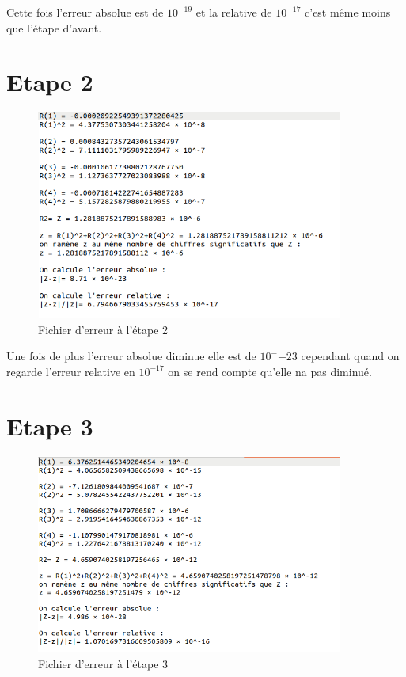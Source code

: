 \documentclass[12,french]{report}
\begin{document}
Cette fois l'erreur absolue est de $10^{-19}$ et la relative de $10^{-17}$ c'est même moins que l'étape d'avant.

\section{Etape 2}

\begin{figure}[H]
	\center
	\includegraphics[width=0.9\textwidth]{./Images/r_2_err}
	\caption{Fichier d'erreur à l'étape 2}
\end{figure}

Une fois de plus l'erreur absolue diminue elle est de $10^-{-23}$ cependant quand on regarde l'erreur relative en $10^{-17}$ on se rend compte qu'elle na pas diminué.

\section{Etape 3}

\begin{figure}[H]
	\center
	\includegraphics[width=0.9\textwidth]{./Images/r_3_err}
	\caption{Fichier d'erreur à l'étape 3}
\end{figure}
\end{document}
